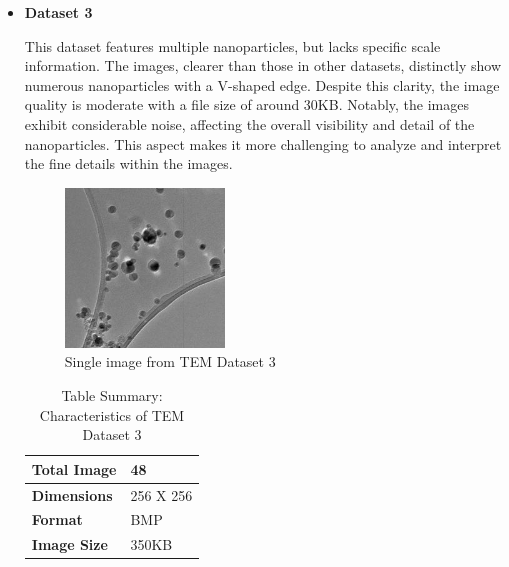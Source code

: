 \begin{itemize}
       
        \vspace{10pt}
        \item \textbf{Dataset 3}


        This dataset features multiple nanoparticles, but lacks specific scale information. The images, clearer than those in other datasets, distinctly show numerous nanoparticles with a V-shaped edge. Despite this clarity, the image quality is moderate with a file size of around 30KB. Notably, the images exhibit considerable noise, affecting the overall visibility and detail of the nanoparticles. This aspect makes it more challenging to analyze and interpret the fine details within the images.

        \begin{figure}[H]
            \centering
            \includegraphics[width=0.4\textwidth]{img/Results/Dataset_3/SIngle_D3.jpg}
            \caption{Single image from TEM Dataset 3}\label{fig:TEM Dataset 1}
        \end{figure}
        
        \begin{table}[H]
                  \centering
                  \caption{Table Summary: Characteristics of TEM Dataset 3}
                  \begin{tabularx}{.7\linewidth}{|X|X|}
                    \hline
                    \textbf{Total Image} & 48 \\
                    \hline
                    \textbf{Dimensions} & 256 X 256\\
                    \hline
                    \textbf{Format} & BMP \\
                    \hline
                    \textbf{Image Size} & 350KB \\
                    \hline
                  \end{tabularx}
              \end{table}
            

\end{itemize}
